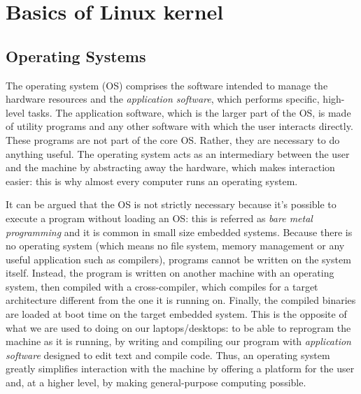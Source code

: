 \chapter{Basics of Linux kernel} %
\label{ch:introduction}

\section{Operating Systems}
\label{sec:os}
The operating system (OS) comprises the software intended to manage the hardware resources and the \textit{application software}, which performs specific, high-level tasks. The application software, which is the larger part of the OS, is made of utility programs and any other software with which the user interacts directly. These programs are not part of the core OS. Rather, they are necessary to do anything useful. The operating system acts as an intermediary between the user and the machine by abstracting away the hardware, which makes interaction easier: this is why almost every computer runs an operating system.

It can be argued that the OS is not strictly necessary because it's possible to execute a program without loading an OS: this is referred as \textit{bare metal programming} and it is common in small size embedded systems. Because there is no operating system (which means no file system, memory management or any useful application such as compilers), programs cannot be written on the system itself. Instead, the program is written on another machine with an operating system, then compiled with a cross-compiler, which compiles for a target architecture different from the one it is running on. Finally, the compiled binaries are loaded at boot time on the target embedded system. This is the opposite of what we are used to doing on our laptops/desktops: to be able to reprogram the machine as it is running, by writing and compiling our program with \textit{application software} designed to edit text and compile code. Thus, an operating system greatly simplifies interaction with the machine by offering a platform for the user and, at a higher level, by making general-purpose computing possible.

